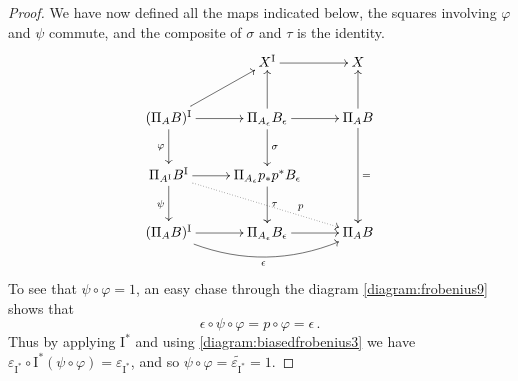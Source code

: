 \documentclass[12pt]{article}
\newcommand{\ra}{\ensuremath{\rightarrow}}
\newcommand{\I}{\ensuremath{\mathrm{I}}}
\theoremstyle{remark}
\theoremstyle{definition}
\begin{document}
\begin{proof}
We have now defined all the maps indicated below, the squares involving $\varphi$ and $\psi$ commute, and the  composite of $\sigma$ and $\tau$  is the identity.
\begin{equation}\label{diagram:frobenius9}
\xymatrix{
& X^\I \ar[r] & X \\
 (\Pi_AB)^\I  \ar[r]  \ar[ru] \ar[d]_{\varphi} 
 	& \Pi_{A_\epsilon}B_\epsilon  \ar[u] \ar[d]^\sigma \ar[r] & \Pi_{A}B \ar[u]\ar[dd]^= \\
 \Pi_{A^\I}B^\I \ar[r] \ar[d]_{\psi} \ar@{..>}[rrd]^>>>>>>>>>>>{p} 
 	& \Pi_{A_\epsilon} p_*p^* B_\epsilon \ar[d]^\tau & \\
  (\Pi_AB)^\I  \ar[r] \ar@/_4ex/ [rr]_\epsilon & \Pi_{A_\epsilon}B_\epsilon \ar[r] & \Pi_{A}B 
}
\end{equation}
%
To see that $\psi\circ\varphi = 1$, an easy chase through the diagram \eqref{diagram:frobenius9} shows that
\[
\epsilon\circ \psi\circ\varphi = p \circ \varphi = \epsilon\,.
\]
Thus by applying $\I^*$ and using \eqref{diagram:biasedfrobenius3} we have $
\varepsilon_{\I^*} \circ \I^*(\psi \circ\varphi) = \varepsilon_{\I^*}$, 
and so $\psi \circ\varphi = \widetilde{\varepsilon_{\I^*}} = 1$.

%
%


\end{proof}
\end{document}
